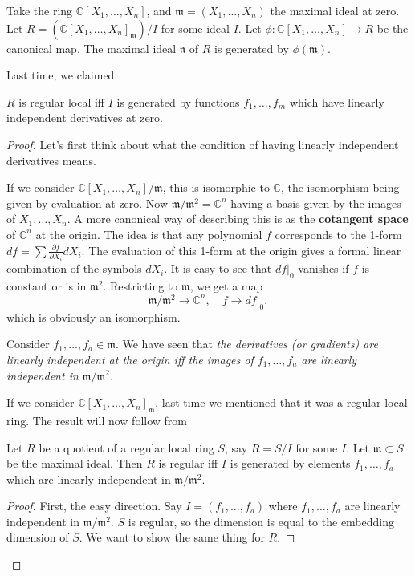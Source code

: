 Take the ring $\mathbb{C}[X_1, \dots, X_n]$, and $\mathfrak{m} = (X_1, \dots,
X_n)$ the maximal ideal at zero. Let $R = (\mathbb{C}[X_1, \dots,
X_n]_{\mathfrak{m}})/I$ for some ideal $I$. Let $\phi: \mathbb{C}[X_1, \dots,
X_n] \to R$ be the canonical map. The maximal ideal $\mathfrak{n}$ of $R$ is
generated by $\phi(\mathfrak{m})$.

Last time, we claimed:
\begin{proposition} 
$R$ is regular local iff $I$ is generated by functions $f_1, \dots, f_m$ which
have linearly independent derivatives at zero.
\end{proposition} 

\begin{proof} 
Let's first think about what the condition of having linearly independent
derivatives means. 

If we consider $\mathbb{C}[X_1, \dots, X_n]/\mathfrak{m}$,
this is isomorphic to $\mathbb{C}$, the isomorphism being given by evaluation
at zero. 
Now $\mathfrak{m}/\mathfrak{m}^2 = \mathbb{C}^n$ having a basis given
by the images of $X_1, \dots, X_n$. A more canonical way of describing this is
as the \textbf{cotangent space} of $\mathbb{C}^n$ at the origin. The idea is
that any polynomial $f$ corresponds to the 1-form $df = \sum \frac{\partial
f}{\partial X_i} dX_i$. The evaluation of this 1-form at the origin gives a
formal linear combination of the symbols $dX_i$. It is easy to see that $df|_0$
vanishes if $f$ is constant or is in $\mathfrak{m}^2$.
Restricting to $\mathfrak{m}$, we get a map
\[ \mathfrak{m}/\mathfrak{m}^2 \to \mathbb{C}^n, \quad f \to df|_0,  \]
which is obviously an isomorphism.

Consider $f_1, \dots, f_a \in \mathfrak{m}$. We have seen that \emph{the derivatives (or gradients) are
linearly independent at the origin iff the images of $f_1, \dots, f_a$ are
linearly independent in $\mathfrak{m}/\mathfrak{m}^2$. }

If we consider $\mathbb{C}[X_1, \dots,X_n]_{\mathfrak{m}}$, last time we
mentioned that it was a regular local ring. The result will now follow from
\begin{lemma} 
Let $R $ be a quotient of a regular local ring $S$, say $R = S/I$ for some
$I$. Let $\mathfrak{m} \subset S$ be the maximal ideal. Then $R$ is regular iff
$I$ is generated by elements $f_1, \dots, f_a$ which are linearly independent
in $\mathfrak{m}/\mathfrak{m}^2$.
\end{lemma} 
\begin{proof} 
First, the easy direction. Say $I = (f_1,\dots, f_a)$ where $f_1, \dots, f_a$
are linearly independent in $\mathfrak{m}/\mathfrak{m}^2$. $S$ is regular, so
the dimension is equal to the embedding dimension of $S$. We want to show the
same thing for $R$.


\end{proof}
\end{proof}
